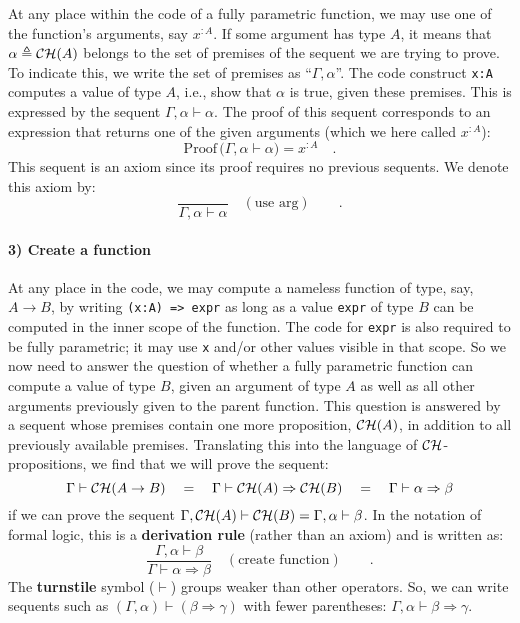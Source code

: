 At any place within the code of a fully parametric function, we may
use one of the function\textsf{'}s arguments, say $x^{:A}$. If some argument
has type $A$, it means that $\alpha\triangleq{\cal CH}(A)$ belongs
to the set of premises of the sequent we are trying to prove. To indicate
this, we write the set of premises as \textsf{``}$\Gamma,\alpha$\textsf{''}. The
code construct \lstinline!x:A! computes a value of type $A$, i.e.,
show that $\alpha$ is true, given these premises. This is expressed
by the sequent $\Gamma,\alpha\vdash\alpha$. The proof of this sequent
corresponds to an expression that returns one of the given arguments
(which we here called $x^{:A}$):
\[
\text{Proof}\,\big(\Gamma,\alpha\vdash\alpha\big)=x^{:A}\quad.
\]
This sequent is an axiom since its proof requires no previous sequents.
We denote this axiom by:
\[
\frac{~}{\Gamma,\alpha\vdash\alpha}\quad(\text{use arg})\quad\quad.
\]


\paragraph{3) Create a function}

At any place in the code, we may compute a nameless function of type,
say, $A\rightarrow B$, by writing \lstinline!(x:A) => expr! as long
as a value \lstinline!expr! of type $B$ can be computed in the inner
scope of the function. The code for \lstinline!expr! is also required
to be fully parametric; it may use \lstinline!x! and/or other values
visible in that scope. So we now need to answer the question of whether
a fully parametric function can compute a value of type $B$, given
an argument of type $A$ as well as all other arguments previously
given to the parent function. This question is answered by a sequent
whose premises contain one more proposition, ${\cal CH}(A)$, in addition
to all previously available premises. Translating this into the language
of ${\cal CH}$-propositions, we find that we will prove the sequent:
\[
\Gamma\vdash{\cal CH}(A\rightarrow B)\quad=\quad\Gamma\vdash{\cal CH}(A)\Rightarrow{\cal CH}(B)\quad=\quad\Gamma\vdash\alpha\Rightarrow\beta
\]
if we can prove the sequent $\Gamma,{\cal CH}(A)\vdash{\cal CH}(B)=\Gamma,\alpha\vdash\beta$.
In the notation of formal logic, this is a \textbf{derivation rule}
(rather than an axiom) and is written as:
\[
\frac{\Gamma,\alpha\vdash\beta}{\Gamma\vdash\alpha\Rightarrow\beta}\quad(\text{create function})\quad\quad.
\]
The \textbf{turnstile}
symbol ($\vdash$) groups weaker than other operators. So, we can
write sequents such as $(\Gamma,\alpha)\vdash(\beta\Rightarrow\gamma)$
with fewer parentheses: $\Gamma,\alpha\vdash\beta\Rightarrow\gamma$.

